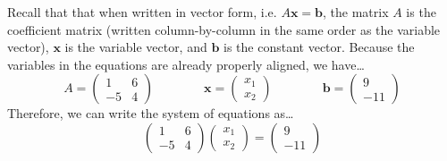 \documentclass[11pt,letterpaper]{article}
\begin{document}
Recall that that when written in vector form, i.e. $A\mathbf{x}= \mathbf{b}$, the matrix $A$ is the coefficient matrix (written column-by-column in the same order as the variable vector), $\mathbf{x}$ is the variable vector, and $\mathbf{b}$ is the constant vector. Because the variables in the equations are already properly aligned, we have\dots
	\[
	A= \begin{pmatrix} 1 & 6 \\ -5 & 4 \end{pmatrix} \qquad\qquad
	\mathbf{x}= \begin{pmatrix} x_1 \\ x_2 \end{pmatrix} \qquad\qquad
	\mathbf{b}= \begin{pmatrix} 9 \\ -11 \end{pmatrix}
	\]
Therefore, we can write the system of equations as\dots
	\[
	\begin{pmatrix} 1 & 6 \\ -5 & 4 \end{pmatrix} \begin{pmatrix} x_1 \\ x_2 \end{pmatrix}= \begin{pmatrix} 9 \\ -11 \end{pmatrix}
	\]
\end{document}
